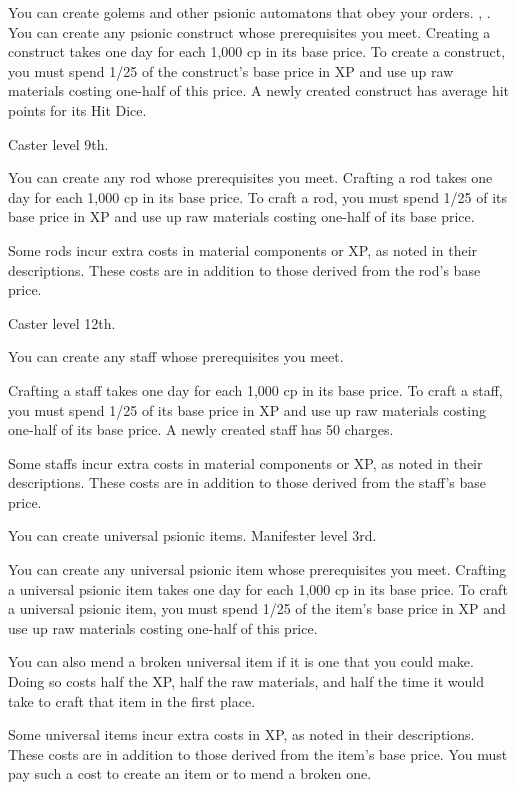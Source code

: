 {You can create golems and other psionic automatons that obey your orders.}
{, .}
{You can create any psionic construct whose prerequisites you meet. Creating a construct takes one day for each 1,000 cp in its base price. To create a construct, you must spend 1/25 of the construct's base price in XP and use up raw materials costing one-half of this price. A newly created construct has average hit points for its Hit Dice.}{}{}

{Caster level 9th.}
{You can create any rod whose prerequisites you meet. Crafting a rod takes one day for each 1,000 cp in its base price. To craft a rod, you must spend 1/25 of its base price in XP and use up raw materials costing one-half of its base price.

Some rods incur extra costs in material components or XP, as noted in their descriptions. These costs are in addition to those derived from the rod's base price.}

{Caster level 12th.}
{You can create any staff whose prerequisites you meet.

Crafting a staff takes one day for each 1,000 cp in its base price. To craft a staff, you must spend 1/25 of its base price in XP and use up raw materials costing one-half of its base price. A newly created staff has 50 charges.

Some staffs incur extra costs in material components or XP, as noted in their descriptions. These costs are in addition to those derived from the staff's base price.}

{You can create universal psionic items.}
{Manifester level 3rd.}
{You can create any universal psionic item whose prerequisites you meet. Crafting a universal psionic item takes one day for each 1,000 cp in its base price. To craft a universal psionic item, you must spend 1/25 of the item's base price in XP and use up raw materials costing one-half of this price.

You can also mend a broken universal item if it is one that you could make. Doing so costs half the XP, half the raw materials, and half the time it would take to craft that item in the first place.

Some universal items incur extra costs in XP, as noted in their descriptions. These costs are in addition to those derived from the item's base price. You must pay such a cost to create an item or to mend a broken one.}{}{}

